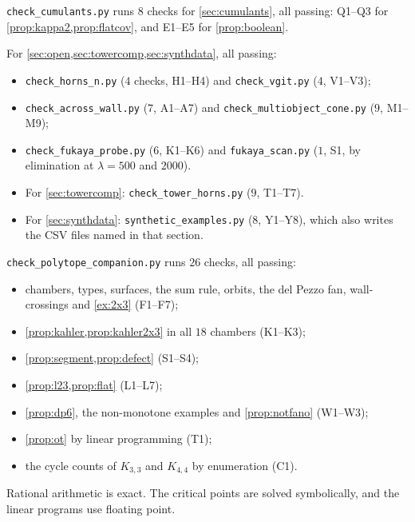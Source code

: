 \documentclass[11pt]{article}
\theoremstyle{definition}
\theoremstyle{remark}
\begin{document}
\texttt{check\_cumulants.py} runs $8$ checks for \cref{sec:cumulants}, all passing: Q1--Q3 for
\cref{prop:kappa2,prop:flatcov}, and E1--E5 for \cref{prop:boolean}.

For \cref{sec:open,sec:towercomp,sec:synthdata}, all passing:
\begin{itemize}[leftmargin=*]
\item \texttt{check\_horns\_n.py} ($4$ checks, H1--H4) and \texttt{check\_vgit.py} ($4$, V1--V3);
\item \texttt{check\_across\_wall.py} ($7$, A1--A7) and \texttt{check\_multiobject\_cone.py} ($9$, M1--M9);
\item \texttt{check\_fukaya\_probe.py} ($6$, K1--K6) and \texttt{fukaya\_scan.py} ($1$, S1, by elimination at $\lambda=500$
  and $2000$).
\item For \cref{sec:towercomp}: \texttt{check\_tower\_horns.py} ($9$, T1--T7).
\item For \cref{sec:synthdata}: \texttt{synthetic\_examples.py} ($8$, Y1--Y8), which also writes the CSV files named in
  that section.
\end{itemize}

\texttt{check\_polytope\_companion.py} runs $26$ checks, all passing:
\begin{itemize}[leftmargin=*]
\item chambers, types, surfaces, the sum rule, orbits, the del Pezzo fan, wall-crossings and
  \cref{ex:2x3} (F1--F7);
\item \cref{prop:kahler,prop:kahler2x3} in all $18$ chambers (K1--K3);
\item \cref{prop:segment,prop:defect} (S1--S4);
\item \cref{prop:l23,prop:flat} (L1--L7);
\item \cref{prop:dp6}, the non-monotone examples and \cref{prop:notfano} (W1--W3);
\item \cref{prop:ot} by linear programming (T1);
\item the cycle counts of $K_{3,3}$ and $K_{4,4}$ by enumeration (C1).
\end{itemize}
Rational arithmetic is exact. The critical points are solved symbolically, and the linear programs use
floating point.
\end{document}
